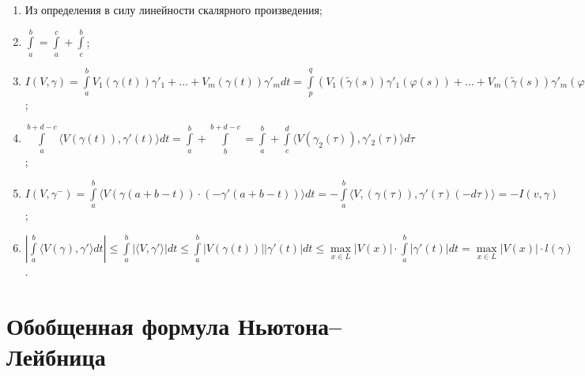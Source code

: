 \documentclass{article}
\begin{document}
            \begin{enumerate}
            
                \item Из определения в силу линейности скалярного произведения;
                
                \item $\int\limits^b_a = \int\limits^c_a + \int\limits^b_c$;
                
                \item $I \left( V, \gamma \right) = \int\limits^b_a V_1 \left( \gamma(t) \right) \gamma'_1 + \ldots + V_m \left( \gamma (t) \right) \gamma'_m dt = \int\limits^q_p \left( V_1 \left( \widetilde{\gamma}(s) \right) \gamma'_1 \left( \varphi(s) \right) + \ldots + V_m \left( \widetilde{\gamma}(s) \right) \gamma'_m \left( \varphi(s) \right) \right) \varphi'(s) ds = I \left( V, \widetilde{\gamma} \right)$;
                
                \item $\int\limits^{b + d - c}_{a} \langle V (\gamma(t)), \gamma'(t) \rangle dt = \int\limits^b_a + \int\limits^{b + d - c}_b = \int\limits^b_a + \int\limits^d_c \langle V (\gamma_2 (\tau) ), \gamma'_2(\tau) \rangle d \tau$;
                
                \item $I \left(V, \gamma^- \right) = \int\limits^b_a \langle V \left( \gamma(a + b - t) \right) \cdot \left( - \gamma'(a + b - t) \right) \rangle dt = - \int\limits^b_a \langle V, \left( \gamma(\tau) \right), \gamma'(\tau) (-d \tau) \rangle = -I \left(v, \gamma \right)$;
                
                \item $\left| \int\limits^b_a \langle V(\gamma), \gamma' \rangle dt \right| \leqslant \int\limits^b_a \left| \langle V, \gamma' \rangle \right| dt \leqslant \int\limits^b_a \left| V \left( \gamma(t) \right) \right| | \gamma'(t) | dt \leqslant \max\limits_{x \in L} \left| V(x) \right| \cdot \int\limits^b_a | \gamma'(t) | dt = \max\limits_{x \in L} \left| V(x) \right| \cdot l(\gamma)$.
                
            \end{enumerate}
            
    \newpage
    
    \section{Обобщенная формула Ньютона--Лейбница}
    
\end{document}
